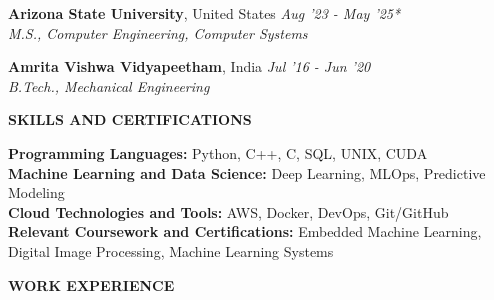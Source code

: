 \documentclass[11pt,a3]{article}
\def\hrulefill{\leavevmode\leaders\hrule height 1pt\hfill\kern 0pt}		%
\begin{document}
{\begin{flushleft}
	\textbf{\large Arizona State University}, \large United States  \hfill \textit{\large Aug '23 - May '25*}	\\
        \hspace{0.5cm} \textit{\large M.S., Computer Engineering, Computer Systems}	\\
		


    \vspace{1mm}

    
    \textbf{\large Amrita Vishwa Vidyapeetham}, \large India  \hfill \textit{\large Jul '16 - Jun '20}	\\
        \hspace{0.5 cm}\textit{\large B.Tech., Mechanical Engineering}

		
	\end{flushleft}


	

	\begin{flushleft}
    {\Large \textbf {SKILLS AND CERTIFICATIONS}}
    
        \vspace{1.5mm}
        \textbf{Programming Languages:} Python, C++, C, SQL, UNIX, CUDA \\
        \textbf{Machine Learning and Data Science:} Deep Learning, MLOps, Predictive Modeling   \\
        \textbf{Cloud Technologies and Tools:} AWS, Docker, DevOps, Git/GitHub \\
        \textbf{Relevant Coursework and Certifications:} Embedded Machine Learning, Digital Image Processing, Machine Learning Systems \\

    \end{flushleft}
		
		
		
	\begin{flushleft}
		{\Large \textbf{WORK EXPERIENCE}} %
  

\end{flushleft}}
\end{document}
